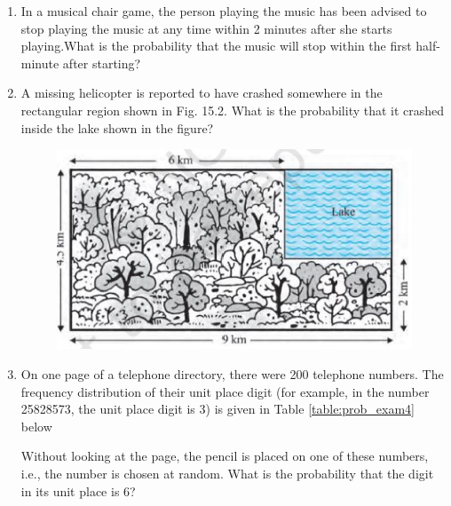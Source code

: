 \begin{enumerate}[label=\thesection.\arabic*.,ref=\thesection.\theenumi]
\item In a musical chair game, the person playing the music has been
advised to stop playing the music at any time within 2 minutes after she starts playing.What is the probability that the music will stop within the first half-minute after starting?
\solution

\item A missing helicopter is reported to have crashed somewhere in the rectangular region shown in Fig. 15.2. What is the probability that it crashed inside the
lake shown in the figure?
\begin{figure}[!ht]
\centering
\includegraphics[width=\columnwidth]{./prob/figs/lake.eps}
\caption{}
\label{fig:lake}
\end{figure}
\solution


   \item On one page of a telephone directory, there were 200 telephone numbers.
The frequency distribution of their unit place digit (for example, in the number 25828573, the unit place digit is 3) is given in Table \ref{table:prob_exam4}
below

\begin{table}[!ht]
\centering
{}
\caption{}
\label{table:prob_exam4}
\end{table}
Without looking at the page, the pencil is placed on one of these numbers, i.e., the number is chosen at random. What is the probability that the digit in its unit place is 6?\\
\solution



\end{enumerate}
